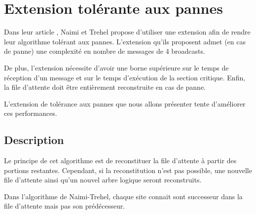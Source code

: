 
\chapter{Extension tolérante aux pannes}\label{fault-tolerant-ext}
Dans leur article \cite{naimi1996}, Naimi et Trehel propose d'utiliser une extension \cite{naimi1988} afin de rendre leur algorithme tolérant aux pannes. L'extension qu'ils proposent admet (en cas de panne) une complexité en nombre de messages de 4 broadcasts.

De plus, l'extension nécessite d'avoir une borne supérieure sur le temps de réception d'un message et sur le temps d'exécution de la section critique. Enfin, la file d'attente doit être entièrement reconstruite en cas de panne.

L'extension de tolérance aux pannes que nous allons présenter \cite{sopena2005} tente d'améliorer ces performances.

\section{Description}

Le principe de cet algorithme est de reconstituer la file d'attente à partir des portions restantes. Cependant, si la reconstitution n'est pas possible, une nouvelle file d'attente ainsi qu'un nouvel arbre logique seront reconstruits.

Dans l'algorithme de Naimi-Trehel, chaque site connait sont successeur dans la file d'attente mais pas son prédécesseur.


